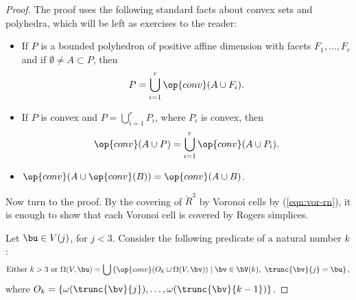 \begin{proof}
The proof uses the following standard facts about convex sets and polyhedra, which will
be left as exercises to the reader:
\begin{itemize}
\item If $P$ is a bounded polyhedron of positive affine dimension with facets $F_1,\ldots,F_r$ and if $\emptyset\ne
A\subset P$,
then 
\begin{displaymath}
P = \bigcup_{i=1}^r \op{conv}(A\cup F_i).
\end{displaymath}
\item If $P$ is convex and $P = \bigcup_{i=1}^r P_i$, where $P_i$ is convex, then
\begin{displaymath}
\op{conv}(A\cup P ) = \bigcup_{i=1}^r\op{conv}(A\cup P_i).
\end{displaymath}
\item $\op{conv}(A\cup \op{conv}(B)) = \op{conv}(A \cup B)$.
\end{itemize}
%
Now turn to the proof.  
By the covering of $\ring{R}^3$  by Voronoi cells by (\ref{eqn:vor-rn}),
it is enough to show that each Voronoi cell is covered by Rogers simplices.

Let $\bu\in V(j)$, for $j<3$.
Consider the following predicate of a natural number $k$: 
\begin{displaymath}
\text{Either  $k>3$ or}~\Omega(V,\bu) = \bigcup
\left\{\op{conv}(O_k \cup\Omega(V,\bv)) %
\mid
\bv \in \bV(k),~\trunc{\bv}{j}=\bu\right\},
\end{displaymath}
where $O_k = \{\omega(\trunc{\bv}{j}),\ldots,\omega(\trunc{\bv}{k-1})\}$.


\end{proof}
